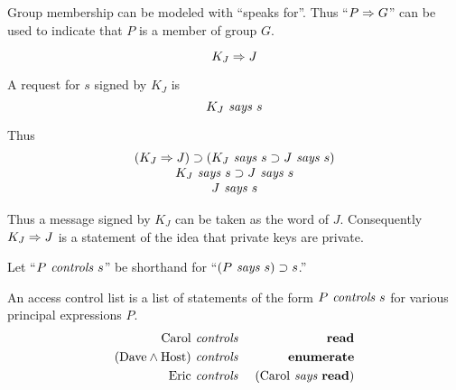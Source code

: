 
\begin{mathpar}




\end{mathpar}

Group membership can be modeled with ``speaks for''. Thus ``$P
\speaksfor G$'' can be used to indicate that $P$ is a member of group
$G$.

\stopslide



\begin{displaymath}
  K_J \speaksfor J
\end{displaymath}

A request for $s$ signed by $K_J$ is
\begin{displaymath}
  K_J \says s
\end{displaymath}

Thus
$$\begin{array}{c}
  (K_J \speaksfor J) \implies (K_J \says s \implies J \says s) \\
  K_J \says s \implies J \says s \\
  J \says s
\end{array}$$

Thus a message signed by $K_J$ can be taken as the word of $J$.
Consequently $K_J \speaksfor J$ is a statement of the idea that private
keys are private.
\stopslide



Let ``$P \controls s$'' be shorthand for ``$(P \says s) \implies s$.''

An access control list is a list of statements of the form $P \controls
s$ for various principal expressions $P$.
\begin{eqnarray*}
  \text{Carol} & \controls & \mathrm{\bf read} \\
  (\text{Dave} \wedge \text{Host}) & \controls & \mathrm{\bf enumerate} \\
  \text{Eric} & \controls & (\text{Carol} \says \mathrm{\bf read})
\end{eqnarray*}

